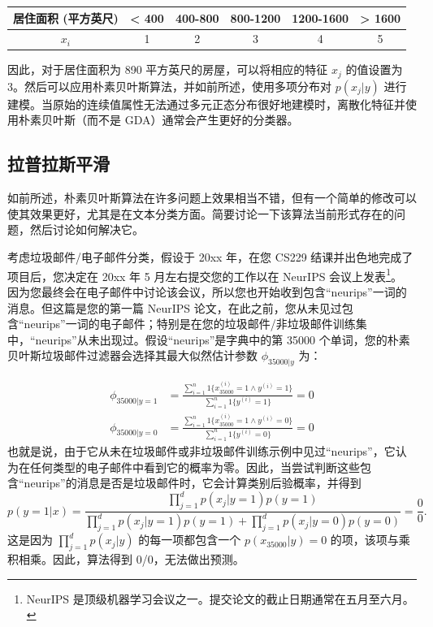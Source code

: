 \begin{table}[H]
    \centering
    \begin{tabular}{c|c|c|c|c|c}
        居住面积 (平方英尺) & < 400 & 400-800 & 800-1200 & 1200-1600 & > 1600 \\
        \hline
        $x_i$ & 1 & 2 & 3 & 4 & 5 
    \end{tabular}
\end{table}

因此，对于居住面积为 890 平方英尺的房屋，可以将相应的特征 $x_j$ 的值设置为 3。然后可以应用朴素贝叶斯算法，并如前所述，使用多项分布对 $p(x_j|y)$ 进行建模。当原始的连续值属性无法通过多元正态分布很好地建模时，离散化特征并使用朴素贝叶斯（而不是 GDA）通常会产生更好的分类器。

\subsection{拉普拉斯平滑}

如前所述，朴素贝叶斯算法在许多问题上效果相当不错，但有一个简单的修改可以使其效果更好，尤其是在文本分类方面。简要讨论一下该算法当前形式存在的问题，然后讨论如何解决它。

考虑垃圾邮件/电子邮件分类，假设于 20xx 年，在您 CS229 结课并出色地完成了项目后，您决定在 20xx 年 5 月左右提交您的工作以在 NeurIPS 会议上发表\footnote{NeurIPS 是顶级机器学习会议之一。提交论文的截止日期通常在五月至六月。}。 因为您最终会在电子邮件中讨论该会议，所以您也开始收到包含“neurips”一词的消息。但这篇是您的第一篇 NeurIPS 论文，在此之前，您从未见过包含“neurips”一词的电子邮件；特别是在您的垃圾邮件/非垃圾邮件训练集中，“neurips”从未出现过。假设“neurips”是字典中的第 35000 个单词，您的朴素贝叶斯垃圾邮件过滤器会选择其最大似然估计参数 $\phi_{35000|y}$ 为：

\begin{align*} 
\phi_{35000|y=1} &= \frac{\sum_{i=1}^n {1}\{x_{35000}^{(i)} = 1 \wedge y^{(i)} = 1\}}{\sum_{i=1}^n {1}\{y^{(i)} = 1\}} = 0 \\ \phi_{35000|y=0} &= \frac{\sum_{i=1}^n {1}\{x_{35000}^{(i)} = 1 \wedge y^{(i)} = 0\}}{\sum_{i=1}^n {1}\{y^{(i)} = 0\}} = 0 
\end{align*}
也就是说，由于它从未在垃圾邮件或非垃圾邮件训练示例中见过“neurips”，它认为在任何类型的电子邮件中看到它的概率为零。因此，当尝试判断这些包含“neurips”的消息是否是垃圾邮件时，它会计算类别后验概率，并得到
\[
    p(y=1|x) = \frac{\prod_{j=1}^d p(x_j|y=1) p(y=1)}{\prod_{j=1}^d p(x_j|y=1) p(y=1) + \prod_{j=1}^d p(x_j|y=0) p(y=0)} = \frac{0}{0}.
\]
这是因为 $\prod_{j=1}^d p(x_j|y)$ 的每一项都包含一个 $p(x_{35000}|y) = 0$ 的项，该项与乘积相乘。因此，算法得到 0/0，无法做出预测。


